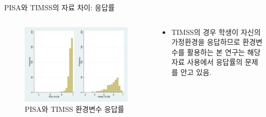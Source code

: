 \documentclass[aspectratio=169,xcolor=dvipsnames,handout]{beamer}
\begin{document}
\begin{frame}{PISA와 TIMSS의 자료 차이: 응답률}
\begin{columns}
    \begin{column}{.5\textwidth}
        \begin{figure}
            \centering
            \includegraphics[scale=0.08]{fig/pnt_response.png}
            \caption{PISA와 TIMSS 환경변수 응답률}
        \end{figure}
    \end{column}    
    \begin{column}{.5\textwidth}
        \begin{itemize}
            \item TIMSS의 경우 학생이 자신의 가정환경을 응답하므로 환경변수를 활용하는 본 연구는 해당자료 사용에서 응답률의 문제를 안고 있음.
        \end{itemize}
    \end{column}    
\end{columns}
\end{frame}
\end{document}
